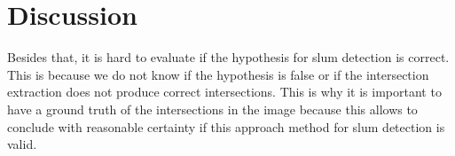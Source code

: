 \section{Discussion}




Besides that, it is hard to evaluate if the hypothesis for slum detection is correct. This is because we do not know if the hypothesis is false or if the intersection extraction does not produce correct intersections. This is why it is important to have a ground truth of the intersections in the image because this allows to conclude with reasonable certainty if this approach method for slum detection is valid.